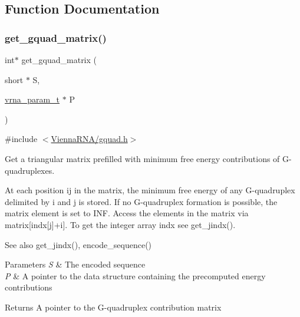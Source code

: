 \subsection{Function Documentation}
\mbox{\label{group__gquads_ga392e45c9615aa123737671603fa4203c}} 
\subsubsection{\texorpdfstring{get\_gquad\_matrix()}{get\_gquad\_matrix()}}
{\footnotesize\ttfamily int$\ast$ get\+\_\+gquad\+\_\+matrix (\begin{DoxyParamCaption}\item[{short $\ast$}]{S,  }\item[{\mbox{\hyperlink{group__energy__parameters_ga8a69ca7d787e4fd6079914f5343a1f35}{vrna\+\_\+param\+\_\+t}} $\ast$}]{P }\end{DoxyParamCaption})}



{\ttfamily \#include $<$\mbox{\hyperlink{gquad_8h}{Vienna\+R\+N\+A/gquad.\+h}}$>$}



Get a triangular matrix prefilled with minimum free energy contributions of G-\/quadruplexes. 

At each position ij in the matrix, the minimum free energy of any G-\/quadruplex delimited by i and j is stored. If no G-\/quadruplex formation is possible, the matrix element is set to I\+NF. Access the elements in the matrix via matrix\mbox{[}indx\mbox{[}j\mbox{]}+i\mbox{]}. To get the integer array indx see get\+\_\+jindx().

\begin{DoxySeeAlso}{See also}
get\+\_\+jindx(), encode\+\_\+sequence()
\end{DoxySeeAlso}

\begin{DoxyParams}{Parameters}
{\em S} & The encoded sequence \\
\hline
{\em P} & A pointer to the data structure containing the precomputed energy contributions \\
\hline
\end{DoxyParams}
\begin{DoxyReturn}{Returns}
A pointer to the G-\/quadruplex contribution matrix 
\end{DoxyReturn}
\mbox{\label{group__gquads_gae41763215b9c64d2a7b67f0df8a28078}} 
